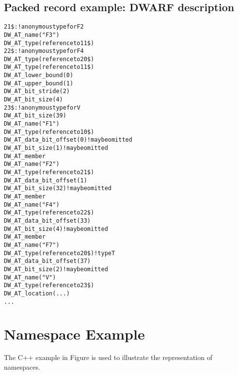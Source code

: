 \subsection{Packed record example: DWARF description}
\label{app:packedrecordexampledwarfdescription}
\begin{alltt}

21\$:  ! anonymous type for F2
            DW\_AT\_name("F3")
            DW\_AT\_type(reference to 11\$)
22\$:  ! anonymous type for F4
        DW\_AT\_type(reference to 20\$)
            DW\_AT\_type(reference to 11\$)
            DW\_AT\_lower\_bound(0)
            DW\_AT\_upper\_bound(1)
        DW\_AT\_bit\_stride(2)
        DW\_AT\_bit\_size(4)
23\$:  ! anonymous type for V
        DW\_AT\_bit\_size(39)
            DW\_AT\_name("F1")
            DW\_AT\_type(reference to 10\$)
            DW\_AT\_data\_bit\_offset(0)! may be omitted
            DW\_AT\_bit\_size(1) ! may be omitted
        DW\_AT\_member
            DW\_AT\_name("F2")
            DW\_AT\_type(reference to 21\$)
            DW\_AT\_data\_bit\_offset(1)
            DW\_AT\_bit\_size(32) ! may be omitted
        DW\_AT\_member
            DW\_AT\_name("F4")
            DW\_AT\_type(reference to 22\$)
            DW\_AT\_data\_bit\_offset(33)
            DW\_AT\_bit\_size(4) ! may be omitted
        DW\_AT\_member
            DW\_AT\_name("F7")
            DW\_AT\_type(reference to 20\$) ! type T
            DW\_AT\_data\_bit\_offset(37)
            DW\_AT\_bit\_size(2) ! may be omitted
        DW\_AT\_name("V")
        DW\_AT\_type(reference to 23\$)
        DW\_AT\_location(...)
        ...
\end{alltt}

\section{Namespace Example}
\label{app:namespaceexample}


The C++ example in 
Figure 
is used to illustrate the representation of namespaces.

